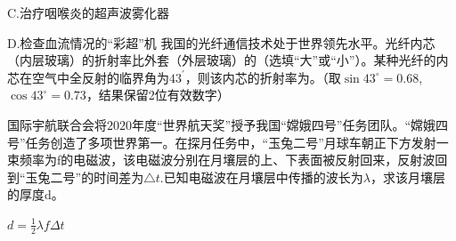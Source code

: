 C.治疗咽喉炎的超声波雾化器

D.检查血流情况的“彩超”机
\question[6] 我国的光纤通信技术处于世界领先水平。光纤内芯（内层玻璃）的折射率比外套（外层玻璃）的（选填“大”或“小”）。某种光纤的内芯在空气中全反射的临界角为$43^\prime$，则该内芯的折射率为。（取$\sin43^{\circ}=0.68$,$\cos43^{\circ}=0.73$，结果保留2位有效数字）

\question[6] 国际宇航联合会将$2020$年度“世界航天奖”授予我国“嫦娥四号”任务团队。“嫦娥四号”任务创造了多项世界第一。在探月任务中，“玉兔二号”月球车朝正下方发射一束频率为f的电磁波，该电磁波分别在月壤层的上、下表面被反射回来，反射波回到“玉兔二号”的时间差为$△t.$已知电磁波在月壤层中传播的波长为$\lambda$，求该月壤层的厚度d。
\begin{solution}{4cm}
    $d=\frac{1}{2} \lambda f \Delta t$
\end{solution}

